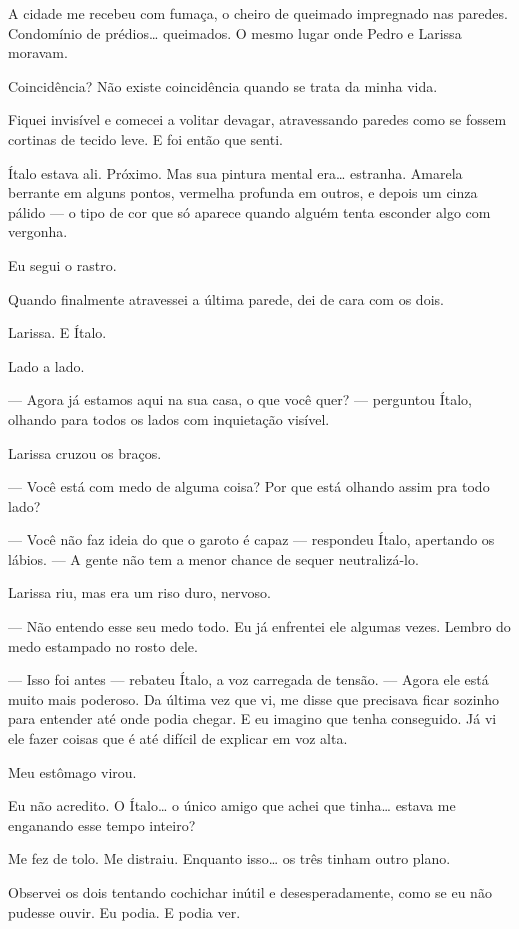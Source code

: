 A cidade me recebeu com fumaça, o cheiro de queimado impregnado nas paredes.  
Condomínio de prédios… queimados.  
O mesmo lugar onde Pedro e Larissa moravam.

Coincidência?  
Não existe coincidência quando se trata da minha vida.

Fiquei invisível e comecei a volitar devagar, atravessando paredes como se fossem cortinas de tecido leve.  
E foi então que senti.

Ítalo estava ali.  
Próximo.  
Mas sua pintura mental era… estranha.  
Amarela berrante em alguns pontos, vermelha profunda em outros, e depois um cinza pálido — o tipo de cor que só aparece quando alguém tenta esconder algo com vergonha.

Eu segui o rastro.

Quando finalmente atravessei a última parede, dei de cara com os dois.

Larissa.  
E Ítalo.

Lado a lado.

— Agora já estamos aqui na sua casa, o que você quer? — perguntou Ítalo, olhando para todos os lados com inquietação visível.

Larissa cruzou os braços.

— Você está com medo de alguma coisa? Por que está olhando assim pra todo lado?

— Você não faz ideia do que o garoto é capaz — respondeu Ítalo, apertando os lábios. — A gente não tem a menor chance de sequer neutralizá-lo.

Larissa riu, mas era um riso duro, nervoso.

— Não entendo esse seu medo todo. Eu já enfrentei ele algumas vezes. Lembro do medo estampado no rosto dele.

— Isso foi antes — rebateu Ítalo, a voz carregada de tensão. — Agora ele está muito mais poderoso.  
Da última vez que vi, me disse que precisava ficar sozinho para entender até onde podia chegar.  
E eu imagino que tenha conseguido.  
Já vi ele fazer coisas que é até difícil de explicar em voz alta.

Meu estômago virou.

Eu não acredito.  
O Ítalo…  
o único amigo que achei que tinha…  
estava me enganando esse tempo inteiro?

Me fez de tolo.  
Me distraiu.  
Enquanto isso… os três tinham outro plano.

Observei os dois tentando cochichar inútil e desesperadamente, como se eu não pudesse ouvir.  
Eu podia.  
E podia ver.

